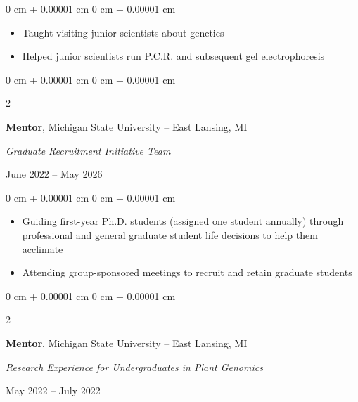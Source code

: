 \documentclass[10pt, letterpaper]{article}
\newenvironment{highlights}{
    \begin{itemize}[
        topsep=0.10 cm,
        parsep=0.10 cm,
        partopsep=0pt,
        itemsep=0pt,
        leftmargin=0 cm + 10pt
    ]
}{
    \end{itemize}
} %
\newenvironment{onecolentry}{
    \begin{adjustwidth}{
        0 cm + 0.00001 cm
    }{
        0 cm + 0.00001 cm
    }
}{
    \end{adjustwidth}
} %
\newenvironment{twocolentry}[2][]{
    \onecolentry
    \def\secondColumn{#2}
    \setcolumnwidth{\fill, 4.5 cm}
    \begin{paracol}{2}
}{
    \switchcolumn \raggedleft \secondColumn
    \end{paracol}
    \endonecolentry
} %
\begin{document}
        \vspace{0.10 cm}
        
        \begin{onecolentry}
            \begin{highlights}
                \item Taught visiting junior scientists about genetics
                \item Helped junior scientists run P.C.R. and subsequent gel electrophoresis
            \end{highlights}
        \end{onecolentry}

        \vspace{0.2 cm}


        \begin{samepage} 
            \begin{twocolentry}{
                June 2022 – May 2026
                }
                \textbf{Mentor}, Michigan State University -- East Lansing, MI
                
                \vspace{0.05 cm}

                \textit{Graduate Recruitment Initiative Team}
            \end{twocolentry}
        \end{samepage}         

        \vspace{0.10 cm}
        
        \begin{onecolentry}
            \begin{highlights}       
                \item Guiding first-year Ph.D. students (assigned one student annually) through professional and general graduate student life decisions to help them acclimate
                \item Attending group-sponsored meetings to recruit and retain graduate students
            \end{highlights}
        \end{onecolentry}

        
        \vspace{0.2 cm}


        \begin{samepage} 
            \begin{twocolentry}{
                May 2022 – July 2022
                }
                \textbf{Mentor}, Michigan State University -- East Lansing, MI
                
                \vspace{0.05 cm}

                \textit{Research Experience for Undergraduates in Plant Genomics}
            \end{twocolentry}
        \end{samepage}    
        
\end{document}
